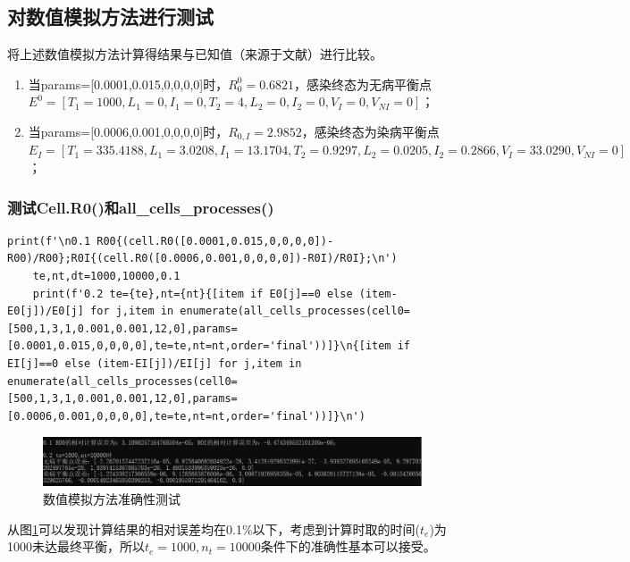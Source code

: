 \documentclass{ctexart}
\begin{document}
\subsection{对数值模拟方法进行测试}
将上述数值模拟方法计算得结果与已知值（来源于文献\cite{1}）进行比较。
\begin{enumerate}
    \item 当params=[0.0001,0.015,0,0,0,0]时，$R_{0}^{0}=0.6821$，感染终态为无病平衡点$E^{0}=[T_{1}=1000,L_{1}=0,I_{1}=0,T_{2}=4,L_{2}=0,I_{2}=0,V_{I}=0,V_{NI}=0]$；
    \item 当params=[0.0006,0.001,0,0,0,0]时，$R_{0,I}=2.9852$，感染终态为染病平衡点$E_{I}=[T_{1}=335.4188,L_{1}=3.0208,I_{1}=13.1704,T_{2}=0.9297,L_{2}=0.0205,I_{2}=0.2866,V_{I}=33.0290,V_{NI}=0]$；
\end{enumerate}
\subsubsection{测试Cell.R0()和all\_cells\_processes()}
\begin{lstlisting}[label={lst.4}, caption={数值模拟方法准确性测试}]
    print(f'\n0.1 R00{(cell.R0([0.0001,0.015,0,0,0,0])-R00)/R00};R0I{(cell.R0([0.0006,0.001,0,0,0,0])-R0I)/R0I};\n')
    te,nt,dt=1000,10000,0.1
    print(f'0.2 te={te},nt={nt}{[item if E0[j]==0 else (item-E0[j])/E0[j] for j,item in enumerate(all_cells_processes(cell0=[500,1,3,1,0.001,0.001,12,0],params=[0.0001,0.015,0,0,0,0],te=te,nt=nt,order='final'))]}\n{[item if EI[j]==0 else (item-EI[j])/EI[j] for j,item in enumerate(all_cells_processes(cell0=[500,1,3,1,0.001,0.001,12,0],params=[0.0006,0.001,0,0,0,0],te=te,nt=nt,order='final'))]}\n')
\end{lstlisting}
\begin{figure}[H]
    \centering
    \includegraphics[width=\linewidth]{0.0.png}
    \caption{数值模拟方法准确性测试}
    \label{fig.0.0}
\end{figure}
从图\ref{fig.0.0}可以发现计算结果的相对误差均在0.1\%以下，考虑到计算时取的时间($t_{e}$)为1000未达最终平衡，所以$t_{e}=1000,n_{t}=10000$条件下的准确性基本可以接受。
\end{document}
